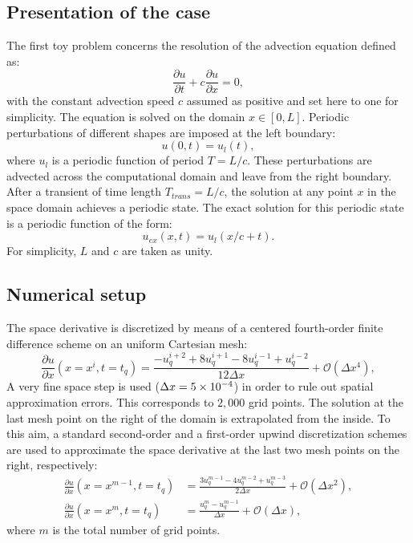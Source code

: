 
\subsection{Presentation of the case}

The first toy problem concerns the resolution of the
advection equation defined as:
\begin{equation}
  \label{eq:convection}
  \frac{\partial u}{\partial t} + c \frac{\partial u}{\partial x} = 0,
\end{equation}
with the constant advection speed $c$ assumed as positive
and set here to one for simplicity. 
The equation is solved on the domain $x \in [0, L]$. 
Periodic perturbations of different shapes are imposed at the left boundary:
\begin{equation}
   u(0, t) = u_l (t),
\end{equation}
where $u_l$ is a periodic function of period $T=L/c$.
These perturbations are advected across the computational 
domain and leave from the right boundary. After a transient of time length $T_{trans}=L/c$, 
the solution at any point $x$ in the space domain achieves a periodic state. 
The exact solution for this periodic state is a periodic function of the form:
\begin{equation}
    u_{ex}(x,t)=u_l(x/c+t).
\end{equation}
For simplicity, $L$ and $c$ are taken as unity.

\subsection{Numerical setup}

The space derivative is discretized by means of a centered 
fourth-order finite difference scheme on an uniform Cartesian mesh:
\begin{equation}
    \frac{\partial u}{\partial x} (x = x^i, t=t_q) =
    \frac{-u^{i+2}_{q} + 8 u^{i+1}_{q} - 8 u^{i-1}_{q} + u^{i-2}_{q}}{12\Delta x}
    + \mathcal{O} (\Delta x^4),
    \label{eq:convection_center4}
\end{equation}
A very fine space step is used ($\Delta x=5\times 10^{-4}$) in order to rule 
out spatial approximation errors. This corresponds to $2,000$ grid points. 
The solution at the last mesh 
point on the right of the domain is extrapolated 
from the inside. To this aim, a standard second-order 
and a first-order upwind discretization schemes
are used to approximate the space derivative at 
the last two mesh points on the right, respectively:
\begin{align}
    \frac{\partial u}{\partial x} (x = x^{m-1}, t=t_q) &=
    \frac{3 u^{m-1}_{q} - 4 u^{m-2}_{q} + u^{m-3}_{q}}{2\Delta x} + \mathcal{O} (\Delta x^2), \\
    \frac{\partial u}{\partial x} (x = x^m, t=t_q) &= 
    \frac{u^{m}_{q} - u^{m-1}_{q}}{\Delta x} + \mathcal{O} (\Delta x),
\label{eq:upwind_scheme}
\end{align}
where $m$ is the total number of grid points.

